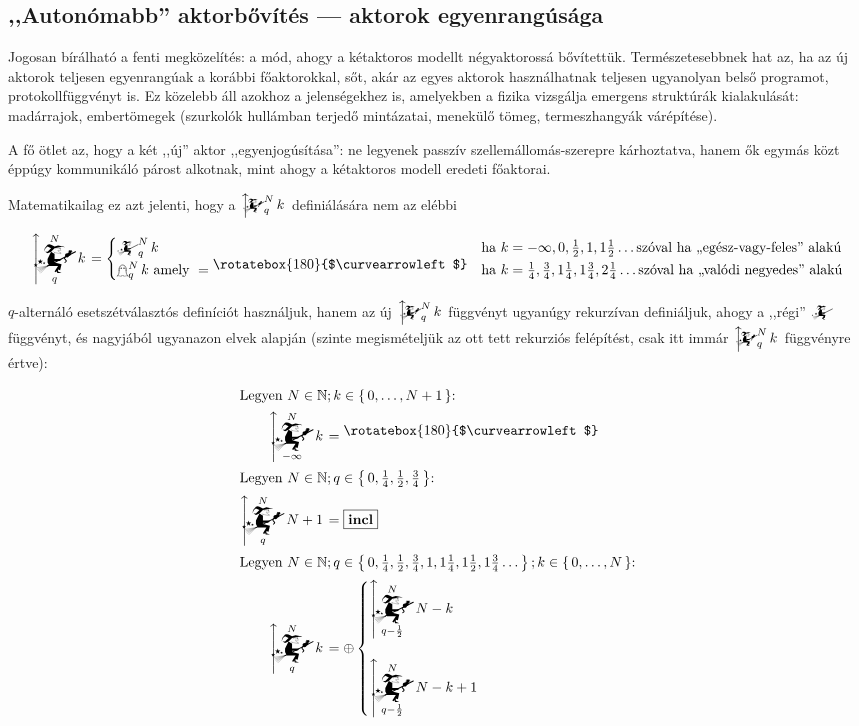 \documentclass{article}
\newcommand{\nothing}{\text{\raisebox{0.4em}{\rotatebox{180}{$\curvearrowleft$}}}}%
\newcommand{\just}[1]{\boxed{#1}}%
\newcommand{\incl}{\mathbf{incl}}
\newcommand{\setOf}[1]{\left\lbrace\,#1\,\right\rbrace}
\newcommand{\mainfuncomm}[3]{\mathwitch_{#2}^{#1}#3}
\newcommand{\mainfunext}[3]{\left\uparrow\!\!\!\mathwitch*_{#2}^{#1}#3\right.}
\newcommand{\gbh}[3]{\mathop{\mathghost}^{#1}_{#2}#3}
\begin{document}
	\subsection{,,Autonómabb'' aktorbővítés --- aktorok egyenrangúsága}

	Jogosan bírálható a fenti megközelítés: a mód, ahogy a kétaktoros modellt négyaktorossá bővítettük.
	Természetesebbnek hat az, ha az új aktorok teljesen egyenrangúak a korábbi főaktorokkal, sőt, akár az egyes aktorok használhatnak teljesen ugyanolyan belső programot, protokollfüggvényt is.
	Ez közelebb áll azokhoz a jelenségekhez is, amelyekben a fizika vizsgálja emergens struktúrák kialakulását: madárrajok, embertömegek (szurkolók hullámban terjedő mintázatai, menekülő tömeg, termeszhangyák várépítése).

	A fő ötlet az, hogy a két ,,új'' aktor ,,egyenjogúsítása'': ne legyenek passzív szellemállomás-szerepre kárhoztatva, hanem ők egymás közt éppúgy kommunikáló párost alkotnak, mint ahogy a kétaktoros modell eredeti főaktorai.

	Matematikailag ez azt jelenti, hogy a $\mainfunext Nqk$ definiálására nem az elébbi

	\[
		\mainfunext Nqk =
		\begin{cases}
			\mainfuncomm Nqk & \text{ha } k = -\infty, 0, \frac12, 1, 1\frac12\dots \text{szóval ha ,,egész-vagy-feles'' alakú}\\
			\gbh Nqk \text{ amely } =\nothing & \text{ha } k = \frac14, \frac34, 1\frac14, 1\frac34, 2\frac14\dots \text{szóval ha ,,valódi negyedes'' alakú}
		\end{cases}
	\]

	$q$-alternáló esetszétválasztós definíciót használjuk, hanem az új $\mainfunext Nqk$ függvényt ugyanúgy rekurzívan definiáljuk, ahogy a ,,régi'' $\mainfuncomm{}{}{}$ függvényt, és nagyjából ugyanazon elvek alapján (szinte megismételjük az ott tett rekurziós felépítést, csak itt immár $\mainfunext Nqk$ függvényre értve):


	\begin{align}
		\intertext{Legyen $N \in \mathbb N; k \in \setOf{0, \dots, N+1}$:}
		\mainfunext N{-\infty}k &= \nothing
		\\\intertext{Legyen $N \in \mathbb N; q \in \setOf{0, \frac14, \frac12, \frac34}$:}
		\mainfunext Nq{N+1} &= \just\incl
		\\\intertext{Legyen $N \in \mathbb N; q \in \setOf{0, \frac14, \frac12, \frac34, 1, 1\frac14, 1\frac12, 1\frac34 \dots}; k \in \setOf{0, \dots, N}$:}
		\mainfunext Nqk &= \oplus\begin{cases}\displaystyle\mainfunext N{q-\frac12}{N-k}&\\\\\displaystyle\mainfunext N{q-\frac12}{N-k+1}&\end{cases}
	\end{align}
\end{document}
